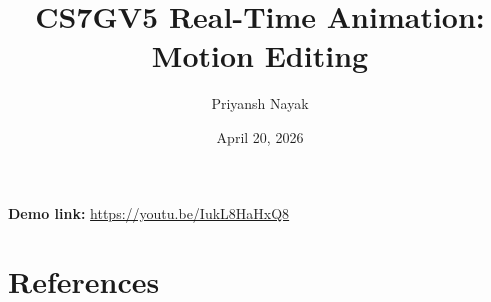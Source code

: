 \documentclass[12pt]{article}
\title{CS7GV5 Real-Time Animation: Motion Editing}
\author{Priyansh Nayak}
\date{April 20, 2026}
\begin{document}
\maketitle

\noindent\textbf{Demo link:} \url{https://youtu.be/IukL8HaHxQ8}






\newpage
\section*{References}
\printbibliography[heading=none]
\end{document}
